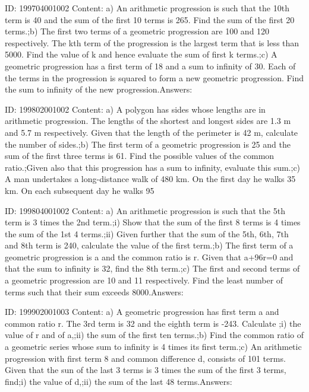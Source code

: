 \documentclass{article}
\begin{document}
ID: 199704001002
Content:
a) An arithmetic progression is such that the 10th term is 40 and the sum of the first 10 terms is 265. Find the sum of the first 20 terms.;b) The first two terms of a geometric progression are 100 and 120 respectively. The kth term of the progression is the largest term that is less than 5000. Find the value of k and hence evaluate the sum of first k terms.;c) A geometric progression has a first term of 18 and a sum to infinity of 30. Each of the terms in the progression is squared to form a new geometric progression. Find the sum to infinity of the new progression.Answers:

ID: 199802001002
Content:
a) A polygon has sides whose lengths are in arithmetic progression. The lengths of the shortest and longest sides are 1.3 m and 5.7 m respectively. Given that the length of the perimeter is 42 m, calculate the number of sides.;b) The first term of a geometric progression is 25 and the sum of the first three terms is 61. Find the possible values of the common ratio.;Given also that this progression has a sum to infinity, evaluate this sum.;c) A man undertakes a long-distance walk of 480 km. On the first day he walks 35 km. On each subsequent day he walks 95%

ID: 199804001002
Content:
a) An arithmetic progression is such that the 5th term is 3 times the 2nd term.;i) Show that the sum of the first 8 terms is 4 times the sum of the 1st 4 terms.;ii) Given further that the sum of the 5th, 6th, 7th and 8th term is 240, calculate the value of the first term.;b) The first term of a geometric progression is a and the common ratio is r. Given that a+96r=0 and that the sum to infinity is 32, find the 8th term.;c) The first and second terms of a geometric progression are 10 and 11 respectively. Find the least number of terms such that their sum exceeds 8000.Answers:

ID: 199902001003
Content:
a) A geometric progression has first term a and common ratio r. The 3rd term is 32 and the eighth term is -243. Calculate ;i) the value of r and of a,;ii) the sum of the first ten terms.;b) Find the common ratio of a geometric series whose sum to infinity is 4 times its first term.;c) An arithmetic progression with first term 8 and common difference d, consists of 101 terms. Given that the sun of the last 3 terms is 3 times the sum of the first 3 terms, find;i) the value of d,;ii) the sum of the last 48 terms.Answers:
\end{document}
